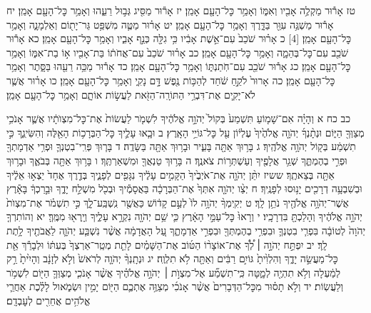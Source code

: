 \documentclass[twoside, openany, parskip=half, 11pt]{book}
\begin{document}
טז אָר֕וּר מַקְלֶ֥ה אָבִ֖יו וְאִמּ֑וֹ וְאָמַ֥ר כׇּל־הָעָ֖ם אָמֵֽן׃
יז אָר֕וּר מַסִּ֖יג גְּב֣וּל רֵעֵ֑הוּ וְאָמַ֥ר כׇּל־הָעָ֖ם אָמֵֽן׃
יח אָר֕וּר מַשְׁגֶּ֥ה עִוֵּ֖ר בַּדָּ֑רֶךְ וְאָמַ֥ר כׇּל־הָעָ֖ם אָמֵֽן׃
יט אָר֗וּר מַטֶּ֛ה מִשְׁפַּ֥ט גֵּר־יָת֖וֹם וְאַלְמָנָ֑ה וְאָמַ֥ר כׇּל־הָעָ֖ם אָמֵֽן׃ ‏[4] כ אָר֗וּר שֹׁכֵב֙ עִם־אֵ֣שֶׁת אָבִ֔יו כִּ֥י גִלָּ֖ה כְּנַ֣ף אָבִ֑יו וְאָמַ֥ר כׇּל־הָעָ֖ם אָמֵֽן׃
כא אָר֕וּר שֹׁכֵ֖ב עִם־כׇּל־בְּהֵמָ֑ה וְאָמַ֥ר כׇּל־הָעָ֖ם אָמֵֽן׃
כב אָר֗וּר שֹׁכֵב֙ עִם־אֲחֹת֔וֹ בַּת־אָבִ֖יו א֣וֹ בַת־אִמּ֑וֹ וְאָמַ֥ר כׇּל־הָעָ֖ם אָמֵֽן׃
כג אָר֕וּר שֹׁכֵ֖ב עִם־חֹֽתַנְתּ֑וֹ וְאָמַ֥ר כׇּל־הָעָ֖ם אָמֵֽן׃
כד אָר֕וּר מַכֵּ֥ה רֵעֵ֖הוּ בַּסָּ֑תֶר וְאָמַ֥ר כׇּל־הָעָ֖ם אָמֵֽן׃
כה אָרוּר֙ לֹקֵ֣חַ שֹׁ֔חַד לְהַכּ֥וֹת נֶ֖פֶשׁ דָּ֣ם נָקִ֑י וְאָמַ֥ר כׇּל־הָעָ֖ם אָמֵֽן׃
כו אָר֗וּר אֲשֶׁ֧ר לֹא־יָקִ֛ים אֶת־דִּבְרֵ֥י הַתּוֹרָֽה־הַזֹּ֖את לַעֲשׂ֣וֹת אוֹתָ֑ם וְאָמַ֥ר כׇּל־הָעָ֖ם אָמֵֽן׃

כב כח א וְהָיָ֗ה אִם־שָׁמ֤וֹעַ תִּשְׁמַע֙ בְּקוֹל֙ יְהֹוָ֣ה אֱלֹהֶ֔יךָ לִשְׁמֹ֤ר לַעֲשׂוֹת֙ אֶת־כׇּל־מִצְוֺתָ֔יו אֲשֶׁ֛ר אָנֹכִ֥י מְצַוְּךָ֖ הַיּ֑וֹם וּנְתָ֨נְךָ֜ יְהֹוָ֤ה אֱלֹהֶ֙יךָ֙ עֶלְי֔וֹן עַ֖ל כׇּל־גּוֹיֵ֥י הָאָֽרֶץ׃ ב וּבָ֧אוּ עָלֶ֛יךָ כׇּל־הַבְּרָכ֥וֹת הָאֵ֖לֶּה וְהִשִּׂיגֻ֑ךָ כִּ֣י תִשְׁמַ֔ע בְּק֖וֹל יְהֹוָ֥ה אֱלֹהֶֽיךָ׃ ג בָּר֥וּךְ אַתָּ֖ה בָּעִ֑יר וּבָר֥וּךְ אַתָּ֖ה בַּשָּׂדֶֽה׃ ד בָּר֧וּךְ פְּרִֽי־בִטְנְךָ֛ וּפְרִ֥י אַדְמָתְךָ֖ וּפְרִ֣י בְהֶמְתֶּ֑ךָ שְׁגַ֥ר אֲלָפֶ֖יךָ וְעַשְׁתְּר֥וֹת צֹאנֶֽךָ׃ ה בָּר֥וּךְ טַנְאֲךָ֖ וּמִשְׁאַרְתֶּֽךָ׃ ו בָּר֥וּךְ אַתָּ֖ה בְּבֹאֶ֑ךָ וּבָר֥וּךְ אַתָּ֖ה בְּצֵאתֶֽךָ׃ ששיז יִתֵּ֨ן יְהֹוָ֤ה אֶת־אֹיְבֶ֙יךָ֙ הַקָּמִ֣ים עָלֶ֔יךָ נִגָּפִ֖ים לְפָנֶ֑יךָ בְּדֶ֤רֶךְ אֶחָד֙ יֵצְא֣וּ אֵלֶ֔יךָ וּבְשִׁבְעָ֥ה דְרָכִ֖ים יָנ֥וּסוּ לְפָנֶֽיךָ׃ ח יְצַ֨ו יְהֹוָ֤ה אִתְּךָ֙ אֶת־הַבְּרָכָ֔ה בַּאֲסָמֶ֕יךָ וּבְכֹ֖ל מִשְׁלַ֣ח יָדֶ֑ךָ וּבֵ֣רַכְךָ֔ בָּאָ֕רֶץ אֲשֶׁר־יְהֹוָ֥ה אֱלֹהֶ֖יךָ נֹתֵ֥ן לָֽךְ׃ ט יְקִֽימְךָ֨ יְהֹוָ֥ה לוֹ֙ לְעַ֣ם קָד֔וֹשׁ כַּאֲשֶׁ֖ר נִֽשְׁבַּֽע־לָ֑ךְ כִּ֣י תִשְׁמֹ֗ר אֶת־מִצְוֺת֙ יְהֹוָ֣ה אֱלֹהֶ֔יךָ וְהָלַכְתָּ֖ בִּדְרָכָֽיו׃ י וְרָאוּ֙ כׇּל־עַמֵּ֣י הָאָ֔רֶץ כִּ֛י שֵׁ֥ם יְהֹוָ֖ה נִקְרָ֣א עָלֶ֑יךָ וְיָֽרְא֖וּ מִמֶּֽךָּ׃ יא וְהוֹתִרְךָ֤ יְהֹוָה֙ לְטוֹבָ֔ה בִּפְרִ֧י בִטְנְךָ֛ וּבִפְרִ֥י בְהֶמְתְּךָ֖ וּבִפְרִ֣י אַדְמָתֶ֑ךָ עַ֚ל הָאֲדָמָ֔ה אֲשֶׁ֨ר נִשְׁבַּ֧ע יְהֹוָ֛ה לַאֲבֹתֶ֖יךָ לָ֥תֶת לָֽךְ׃ יב יִפְתַּ֣ח יְהֹוָ֣ה ׀ לְ֠ךָ֠ אֶת־אוֹצָר֨וֹ הַטּ֜וֹב אֶת־הַשָּׁמַ֗יִם לָתֵ֤ת מְטַֽר־אַרְצְךָ֙ בְּעִתּ֔וֹ וּלְבָרֵ֕ךְ אֵ֖ת כׇּל־מַעֲשֵׂ֣ה יָדֶ֑ךָ וְהִלְוִ֙יתָ֙ גּוֹיִ֣ם רַבִּ֔ים וְאַתָּ֖ה לֹ֥א תִלְוֶֽה׃ יג וּנְתָֽנְךָ֨ יְהֹוָ֤ה לְרֹאשׁ֙ וְלֹ֣א לְזָנָ֔ב וְהָיִ֙יתָ֙ רַ֣ק לְמַ֔עְלָה וְלֹ֥א תִהְיֶ֖ה לְמָ֑טָּה כִּֽי־תִשְׁמַ֞ע אֶל־מִצְוֺ֣ת ׀ יְהֹוָ֣ה אֱלֹהֶ֗יךָ אֲשֶׁ֨ר אָנֹכִ֧י מְצַוְּךָ֛ הַיּ֖וֹם לִשְׁמֹ֥ר וְלַעֲשֽׂוֹת׃ יד וְלֹ֣א תָס֗וּר מִכׇּל־הַדְּבָרִים֙ אֲשֶׁ֨ר אָנֹכִ֜י מְצַוֶּ֥ה אֶתְכֶ֛ם הַיּ֖וֹם יָמִ֣ין וּשְׂמֹ֑אול לָלֶ֗כֶת אַחֲרֵ֛י אֱלֹהִ֥ים אֲחֵרִ֖ים לְעׇבְדָֽם׃
\end{document}

